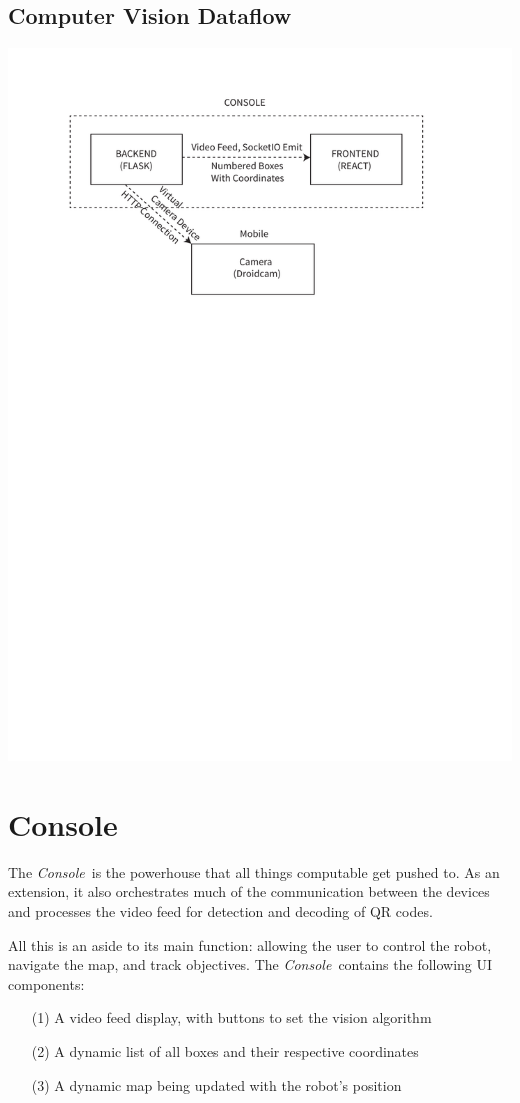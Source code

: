 \documentclass[a4paper,12pt]{article}
\newcommand{\con}{\textit{Console}}
\begin{document}
\subsection{Computer Vision Dataflow} \label{visflow}
\includegraphics[trim=40 550 0 57,scale=0.95,clip]{media/vis.pdf}

\section{Console}

The \con\ is the powerhouse that all things computable get pushed to. As an extension, it also orchestrates much of the communication between the devices and processes the video feed for detection and decoding of QR codes.

All this is an aside to its main function: allowing the user to control the robot, navigate the map, and track objectives.
The \con\ contains the following UI components:
\begin{itemize}
    \item[(1)] A video feed display, with buttons to set the vision algorithm
    \item[(2)] A dynamic list of all boxes and their respective coordinates
    \item[(3)] A dynamic map being updated with the robot's position
\end{itemize}
\end{document}
